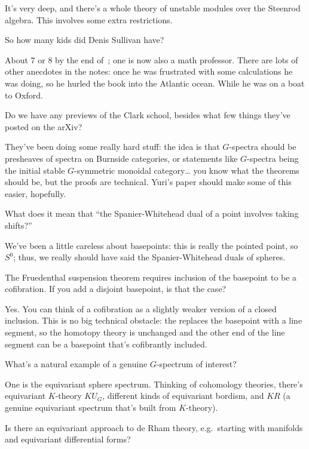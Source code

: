 It's very deep, and there's a whole theory of unstable modules over the Steenrod algebra. This involves some extra
restrictions.
\begin{ques}
So how many kids did Denis Sullivan have?
\end{ques}
About 7 or 8 by the end of~\cite{MITNotes}; one is now also a math professor. There are lots of other anecdotes in
the notes: once he was frustrated with some calculations he was doing, so he hurled the book into the Atlantic
ocean. While he was on a boat to Oxford.
\begin{ques}
Do we have any previews of the Clark school, besides what few things they've posted on the arXiv?
\end{ques}
They've been doing some really hard stuff: the idea is that $G$-spectra should be presheaves of spectra on Burnside
categories, or statements like $G$-spectra being the initial stable $G$-symmetric monoidal category\dots{} you know
what the theorems should be, but the proofs are technical. Yuri's paper should make some of this easier, hopefully.
\begin{ques}
What does it mean that ``the Spanier-Whitehead dual of a point involves taking shifts?''
\end{ques}
We've been a little careless about basepoints: this is really the pointed point, so $S^0$; thus, we really should
have said the Spanier-Whitehead duals of spheres.
\begin{ques}
The Fruedenthal suspension theorem requires inclusion of the basepoint to be a cofibration. If you add a disjoint
basepoint, is that the case?
\end{ques}
Yes. You can think of a cofibration as a slightly weaker version of a closed inclusion. This is no big technical
obstacle: the  replaces the basepoint with a line segment, so the homotopy theory is
unchanged and the other end of the line segment can be a basepoint that's cofibrantly included.
\begin{ques}
What's a natural example of a genuine $G$-spectrum of interest?
\end{ques}
One is the equivariant sphere spectrum. Thinking of cohomology theories, there's equivariant $K$-theory
$\mathit{KU}_G$, different kinds of equivariant bordism, and $\mathit{KR}$ (a genuine equivariant spectrum that's
built from $K$-theory).
\begin{ques}
Is there an equivariant approach to de Rham theory, e.g.\ starting with manifolds and equivariant differential
forms?
\end{ques}
